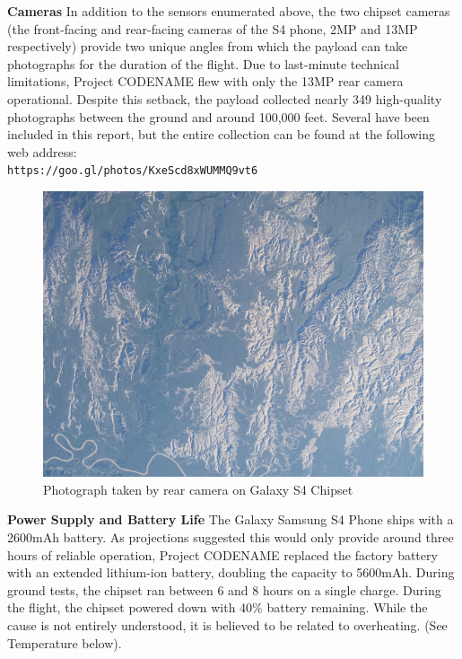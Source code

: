 \documentclass[english]{report}
\begin{document}
\textbf{Cameras} In addition to the sensors enumerated above, the two chipset cameras (the front-facing and rear-facing cameras of the S4 phone, 2MP and 13MP respectively) provide two unique angles from which the payload can take photographs for the duration of the flight. Due to last-minute technical limitations, Project CODENAME flew with only the 13MP rear camera operational.  Despite this setback, the payload collected nearly 349 high-quality photographs between the ground and around 100,000 feet.  Several have been included in this report, but the entire collection can be found at the following web address: \\ \texttt{https://goo.gl/photos/KxeScd8xWUMMQ9vt6}

\begin{figure}[H]
\begin{centering}
\includegraphics[scale=0.9]{./images/rear4}
\par\end{centering}
\caption{Photograph taken by rear camera on Galaxy S4 Chipset}
\end{figure}

\textbf{Power Supply and Battery Life} The Galaxy Samsung S4 Phone ships with a 2600mAh battery.  As projections suggested this would only provide around three hours of reliable operation, Project CODENAME replaced the factory battery with an extended lithium-ion battery, doubling the capacity to 5600mAh.  During ground tests, the chipset ran between 6 and 8 hours on a single charge.  During the flight, the chipset powered down with 40\% battery remaining.  While the cause is not entirely understood, it is believed to be related to overheating. (See Temperature below).
\end{document}
